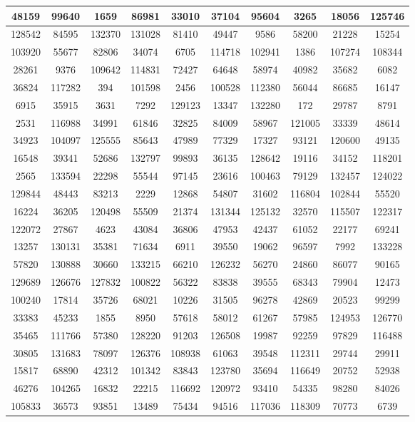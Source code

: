 \documentclass[12pt]{article}
\begin{document}
\begin{appendices}
\begin{table}[H]
\begin{tabular}{|c|c|c|c|c|c|c|c|c|c|}
		48159	& 99640	& 1659	& 86981	& 33010	& 37104	& 95604	& 3265	& 18056	& 125746	\\ \hline
		128542	& 84595	& 132370	& 131028	& 81410	& 49447	& 9586	& 58200	& 21228	& 15254	\\ \hline
		103920	& 55677	& 82806	& 34074	& 6705	& 114718	& 102941	& 1386	& 107274	& 108344	\\ \hline
		28261	& 9376	& 109642	& 114831	& 72427	& 64648	& 58974	& 40982	& 35682	& 6082	\\ \hline
		36824	& 117282	& 394	& 101598	& 2456	& 100528	& 112380	& 56044	& 86685	& 16147	\\ \hline
		6915	& 35915	& 3631	& 7292	& 129123	& 13347	& 132280	& 172	& 29787	& 8791	\\ \hline
		2531	& 116988	& 34991	& 61846	& 32825	& 84009	& 58967	& 121005	& 33339	& 48614	\\ \hline
		34923	& 104097	& 125555	& 85643	& 47989	& 77329	& 17327	& 93121	& 120600	& 49135	\\ \hline
		16548	& 39341	& 52686	& 132797	& 99893	& 36135	& 128642	& 19116	& 34152	& 118201	\\ \hline
		2565	& 133594	& 22298	& 55544	& 97145	& 23616	& 100463	& 79129	& 132457	& 124022	\\ \hline
		129844	& 48443	& 83213	& 2229	& 12868	& 54807	& 31602	& 116804	& 102844	& 55520	\\ \hline
		16224	& 36205	& 120498	& 55509	& 21374	& 131344	& 125132	& 32570	& 115507	& 122317	\\ \hline
		122072	& 27867	& 4623	& 43084	& 36806	& 47953	& 42437	& 61052	& 22177	& 69241	\\ \hline
		13257	& 130131	& 35381	& 71634	& 6911	& 39550	& 19062	& 96597	& 7992	& 133228	\\ \hline
		57820	& 130888	& 30660	& 133215	& 66210	& 126232	& 56270	& 24860	& 86077	& 90165	\\ \hline
		129689	& 126676	& 127832	& 100822	& 56322	& 83838	& 39555	& 68343	& 79904	& 12473	\\ \hline
		100240	& 17814	& 35726	& 68021	& 10226	& 31505	& 96278	& 42869	& 20523	& 99299	\\ \hline
		33383	& 45233	& 1855	& 8950	& 57618	& 58012	& 61267	& 57985	& 124953	& 126770	\\ \hline
		35465	& 111766	& 57380	& 128220	& 91203	& 126508	& 19987	& 92259	& 97829	& 116488	\\ \hline
		30805	& 131683	& 78097	& 126376	& 108938	& 61063	& 39548	& 112311	& 29744	& 29911	\\ \hline
		15817	& 68890	& 42312	& 101342	& 83843	& 123780	& 35694	& 116649	& 20752	& 52938	\\ \hline
		46276	& 104265	& 16832	& 22215	& 116692	& 120972	& 93410	& 54335	& 98280	& 84026	\\ \hline
		105833	& 36573	& 93851	& 13489	& 75434	& 94516	& 117036	& 118309	& 70773	& 6739	\\ \hline
	\end{tabular}
	\label{tab:app_10_sets_labels}
\end{table}

\end{appendices}
\end{document}
